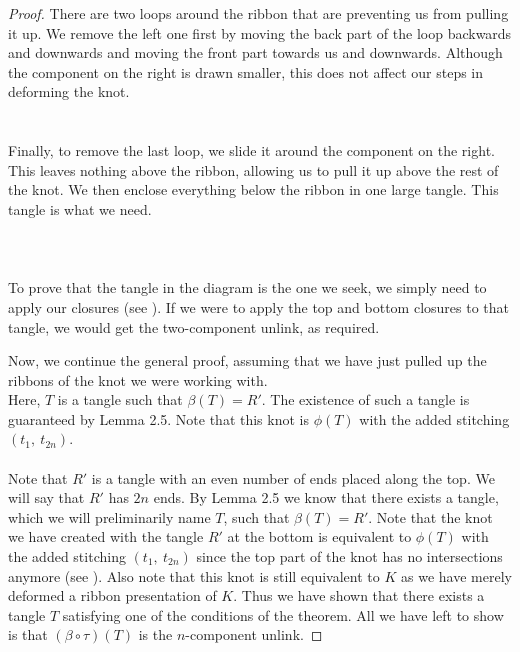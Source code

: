 \documentclass{ws-jktr}
\begin{document}
\begin{proof}
There are two loops around the ribbon that are preventing us from pulling it up.
We remove the left one first by moving the back part of the loop backwards and
downwards and moving the front part towards us and downwards.
Although the component on the right is drawn smaller, this does not affect our
steps in deforming the knot.\\

\\\\

Finally, to remove the last loop, we slide it around the component on the right.
This leaves nothing above the ribbon, allowing us to pull it up above the rest
of the knot.
We then enclose everything below the ribbon in one large tangle.
This tangle is what we need.\\\\

\\\\

To prove that the tangle in the diagram is the one we seek, we simply need to
apply our closures (see \figExplainFour).
If we were to apply the top and bottom closures to that tangle, we would get the
two-component unlink, as required.

Now, we continue the general proof, assuming that we have just pulled up the
ribbons of the knot we were working with.\\

{Here, $T$ is a tangle such that $\beta(T)=R'$.
The existence of such a tangle is guaranteed by Lemma 2.5.
Note that this knot is $\phi(T)$ with the added stitching $(t_1,~t_{2n})$.}\\\\

Note that $R'$ is a tangle with an even number of ends placed along the top.
We will say that $R'$ has $2n$ ends.
By Lemma 2.5 we know that there exists a tangle, which we will preliminarily
name $T$, such that $\beta(T)=R'$.
Note that the knot we have created with the tangle $R'$ at the bottom is
equivalent to $\phi(T)$ with the added stitching $(t_1,~t_{2n})$ since the top
part of the knot has no intersections anymore (see \figFinal).
Also note that this knot is still equivalent to $K$ as we have merely deformed
a ribbon presentation of $K$.
Thus we have shown that there exists a tangle $T$ satisfying one of the
conditions of the theorem.
All we have left to show is that $(\beta\circ\tau)(T)$ is the $n$-component
unlink.


\end{proof}
\end{document}
